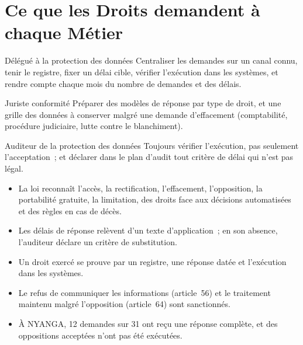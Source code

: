 \section{Ce que les Droits demandent à chaque Métier}
\label{sec:c06-metiers}

\begin{boxmetier}{Délégué à la protection des données}
Centraliser les demandes sur un canal connu, tenir le registre, fixer un
délai cible, vérifier l'exécution dans les systèmes, et rendre compte
chaque mois du nombre de demandes et des délais.
\end{boxmetier}

\begin{boxmetier}{Juriste conformité}
Préparer des modèles de réponse par type de droit, et une grille des
données à conserver malgré une demande d'effacement (comptabilité,
procédure judiciaire, lutte contre le blanchiment).
\end{boxmetier}

\begin{boxmetier}{Auditeur de la protection des données}
Toujours vérifier l'exécution, pas seulement l'acceptation~; et déclarer
dans le plan d'audit tout critère de délai qui n'est pas légal.
\end{boxmetier}

\begin{boxresume}
\begin{itemize}
    \item La loi reconnaît l'accès, la rectification, l'effacement,
          l'opposition, la portabilité gratuite, la limitation, des droits
          face aux décisions automatisées et des règles en cas de décès.
    \item Les délais de réponse relèvent d'un texte d'application~; en son
          absence, l'auditeur déclare un critère de substitution.
    \item Un droit exercé se prouve par un registre, une réponse datée et
          l'exécution dans les systèmes.
    \item Le refus de communiquer les informations (article~56) et le
          traitement maintenu malgré l'opposition (article~64) sont
          sanctionnés.
    \item À NYANGA, 12 demandes sur 31 ont reçu une réponse complète, et des
          oppositions acceptées n'ont pas été exécutées.
\end{itemize}
\end{boxresume}

